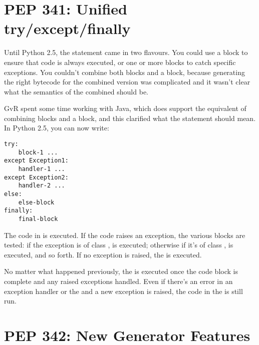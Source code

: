\documentclass{howto}
\begin{document}
\section{PEP 341: Unified try/except/finally\label{pep-341}}

Until Python 2.5, the  statement came in two
flavours. You could use a  block to ensure that code
is always executed, or one or more  blocks to catch 
specific exceptions.  You couldn't combine both  blocks and a
 block, because generating the right bytecode for the
combined version was complicated and it wasn't clear what the
semantics of the combined should be.  

GvR spent some time working with Java, which does support the
equivalent of combining  blocks and a
 block, and this clarified what the statement should
mean.  In Python 2.5, you can now write:

\begin{verbatim}
try:
    block-1 ...
except Exception1:
    handler-1 ...
except Exception2:
    handler-2 ...
else:
    else-block
finally:
    final-block 
\end{verbatim}

The code in  is executed.  If the code raises an
exception, the various  blocks are tested: if the
exception is of class ,  is executed;
otherwise if it's of class ,  is
executed, and so forth.  If no exception is raised, the
 is executed.  

No matter what happened previously, the  is executed
once the code block is complete and any raised exceptions handled.
Even if there's an error in an exception handler or the
 and a new exception is raised, the
code in the  is still run.

\begin{seealso}


\end{seealso}


\section{PEP 342: New Generator Features\label{pep-342}}
\end{document}
